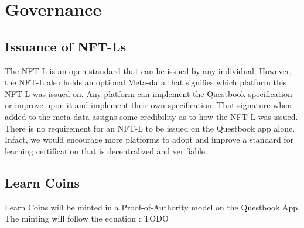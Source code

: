 \documentclass{article}
\begin{document}
  \section{Governance}
    \subsection{Issuance of NFT-Ls}
      The NFT-L is an open standard that can be issued by any individual. However, the NFT-L also holds an optional Meta-data that signifies which platform this NFT-L was issued on.
      Any platform can implement the Questbook specification or improve upon it and implement their own specification. That signature when added to the meta-data assigns some credibility as to how the NFT-L was issued.
      \break
      There is no requirement for an NFT-L to be issued on the Questbook app alone. Infact, we would encourage more platforms to adopt and improve a standard for learning certification that is decentralized and verifiable.
    \subsection{Learn Coins}
      Learn Coins will be minted in a Proof-of-Authority model on the Questbook App. The minting will follow the equation : TODO
\end{document}
